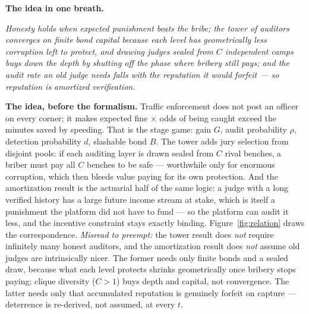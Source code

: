 \documentclass[11pt,a4paper]{article}
\newcommand{\onebreath}[1]{\begin{center}\emph{#1}\end{center}}
\begin{document}
\textbf{The idea in one breath.}
\onebreath{Honesty holds when expected punishment beats the bribe; the tower of auditors converges on finite bond capital because each level has geometrically less corruption left to protect, and drawing judges sealed from $C$ independent camps buys down the depth by shutting off the phase where bribery still pays; and the audit rate an old judge needs falls with the reputation it would forfeit --- so reputation is amortized verification.}

\textbf{The idea, before the formalism.} Traffic enforcement does not post an officer on every corner; it makes expected fine $\times$ odds of being caught exceed the minutes saved by speeding. That is the stage game: gain $G$, audit probability $\rho$, detection probability $d$, slashable bond $B$. The tower adds jury selection from disjoint pools: if each auditing layer is drawn sealed from $C$ rival benches, a briber must pay all $C$ benches to be safe --- worthwhile only for enormous corruption, which then bleeds value paying for its own protection. And the amortization result is the actuarial half of the same logic: a judge with a long verified history has a large future income stream at stake, which is itself a punishment the platform did not have to fund --- so the platform can audit it less, and the incentive constraint stays exactly binding. Figure~\ref{fig:relation} draws the correspondence. \emph{Misread to preempt:} the tower result does \emph{not} require infinitely many honest auditors, and the amortization result does \emph{not} assume old judges are intrinsically nicer. The former needs only finite bonds and a sealed draw, because what each level protects shrinks geometrically once bribery stops paying; clique diversity ($C>1$) buys depth and capital, not convergence. The latter needs only that accumulated reputation is genuinely forfeit on capture --- deterrence is re-derived, not assumed, at every $t$.


\end{document}
